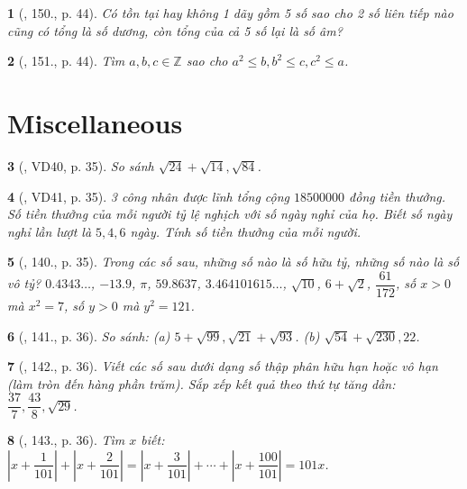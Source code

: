 \documentclass{article}
\newtheorem{baitoan}{}
\begin{document}
\begin{baitoan}[\cite{Binh_Toan_7_tap_1}, 150., p. 44]
	Có tồn tại hay không 1 dãy gồm 5 số sao cho 2 số liên tiếp nào cũng có tổng là số dương, còn tổng của cả 5 số lại là số âm?
\end{baitoan}

\begin{baitoan}[\cite{Binh_Toan_7_tap_1}, 151., p. 44]
	Tìm $a,b,c\in\mathbb{Z}$ sao cho $a^2\le b,b^2\le c,c^2\le a$.
\end{baitoan}


\section{Miscellaneous}

\begin{baitoan}[\cite{Tuyen_Toan_7}, VD40, p. 35]
	So sánh $\sqrt{24} + \sqrt{14},\sqrt{84}$.
\end{baitoan}

\begin{baitoan}[\cite{Tuyen_Toan_7}, VD41, p. 35]
	3 công nhân được lĩnh tổng cộng $18 500 000$ đồng tiền thưởng. Số tiền thưởng của mỗi người tỷ lệ nghịch với số ngày nghỉ của họ. Biết số ngày nghỉ lần lượt là $5,4,6$ ngày. Tính số tiền thưởng của mỗi người.
\end{baitoan}

\begin{baitoan}[\cite{Tuyen_Toan_7}, 140., p. 35]
	Trong các số sau, những số nào là số hữu tỷ, những số nào là số vô tỷ? $0.4343\ldots$, $-13.9$, $\pi$, $59.8637$, $3.464101615\ldots$, $\sqrt{10}$, $6 + \sqrt{2}$, $\dfrac{61}{172}$, số $x > 0$ mà $x^2 = 7$, số $y > 0$ mà $y^2 = 121$.
\end{baitoan}

\begin{baitoan}[\cite{Tuyen_Toan_7}, 141., p. 36]
	So sánh: (a) $5 + \sqrt{99},\sqrt{21} + \sqrt{93}$. (b) $\sqrt{54} + \sqrt{230},22$.	
\end{baitoan}

\begin{baitoan}[\cite{Tuyen_Toan_7}, 142., p. 36]
	Viết các số sau dưới dạng số thập phân hữu hạn hoặc vô hạn (làm tròn đến hàng phần trăm). Sắp xếp kết quả theo thứ tự tăng dần: $\dfrac{37}{7},\dfrac{43}{8},\sqrt{29}$.
\end{baitoan}

\begin{baitoan}[\cite{Tuyen_Toan_7}, 143., p. 36]
	Tìm $x$ biết: $\left|x + \dfrac{1}{101}\right| + \left|x + \dfrac{2}{101}\right| = \left|x + \dfrac{3}{101}\right| + \cdots + \left|x + \dfrac{100}{101}\right| = 101x$.
\end{baitoan}
\end{document}
